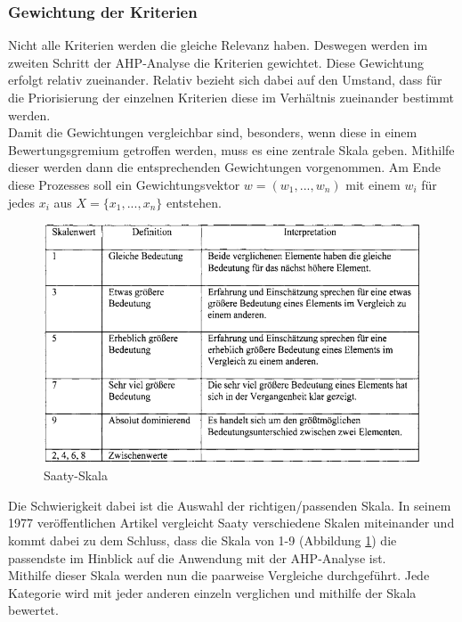 \subsubsection{Gewichtung der Kriterien}
Nicht alle Kriterien werden die gleiche Relevanz haben. Deswegen werden im zweiten Schritt der AHP-Analyse die Kriterien gewichtet.\autocite[Vgl.][S.9]{Mu.2018} Diese Gewichtung erfolgt relativ zueinander. Relativ bezieht sich dabei auf den Umstand, dass für die Priorisierung der einzelnen Kriterien diese im Verhältnis zueinander bestimmt werden. \\
Damit die Gewichtungen vergleichbar sind, besonders, wenn diese in einem Bewertungsgremium getroffen werden, muss es eine zentrale Skala geben. Mithilfe dieser werden dann die entsprechenden Gewichtungen vorgenommen. Am Ende diese Prozesses soll ein Gewichtungsvektor $w=(w_{1}, ..., w_{n})$ mit einem $w_i$ für jedes $x_i$ aus $X=\{x_{1}, ..., x_{n}\}$ entstehen\autocite[Vgl.][S.4]{Brunelli.2015}. \\
\begin{figure}[h!]
	\centering
	\includegraphics[scale = 0.8]{img/Skala.png}
	\caption{Saaty-Skala}
	\label{img:scale}
\end{figure}
Die Schwierigkeit dabei ist die Auswahl der richtigen/passenden Skala. In seinem 1977 veröffentlichen Artikel\autocite{Saaty.1977} vergleicht Saaty verschiedene Skalen miteinander und kommt dabei zu dem Schluss, dass die Skala von 1-9 (Abbildung \ref{img:scale}) die passendste im Hinblick auf die Anwendung mit der AHP-Analyse ist. \\
Mithilfe dieser Skala werden nun die paarweise Vergleiche durchgeführt. Jede Kategorie wird mit jeder anderen einzeln verglichen und mithilfe der Skala bewertet.\autocite[Vgl.][S.106]{Fink.2006}  
